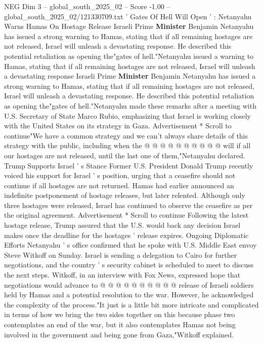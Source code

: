\begin{textsample}{NEG Dim 3 – global\_south\_2025\_02 – Score -1.00 – global\_south\_2025\_02/121330709.txt}  \label{ex:f3_neg_018}
' Gates Of Hell Will Open ' : Netanyahu Warns Hamas On Hostage Release Israeli Prime \textbf{Minister} Benjamin Netanyahu has issued a strong warning to Hamas, stating that if all remaining hostages are not released, Israel will unleash a devastating response.
He described this potential retaliation as opening the"gates of hell."Netanyahu issued a warning to Hamas, stating that if all remaining hostages are not released, Israel will unleash a devastating response Israeli Prime \textbf{Minister} Benjamin Netanyahu has issued a strong warning to Hamas, stating that if all remaining hostages are not released, Israel will unleash a devastating response.
He described this potential retaliation as opening the"gates of hell."Netanyahu made these remarks after a meeting with U.S.
Secretary of State Marco Rubio, emphasizing that Israel is working closely with the United States on its strategy in Gaza.
Advertisement * Scroll to continue"We have a common strategy and we can't always share details of this strategy with the public, including when the @ @ @ @ @ @ @ @ @ @ will if all our hostages are not released, until the last one of them,"Netanyahu declared.
Trump Supports Israel ' s Stance Former U.S.
President Donald Trump recently voiced his support for Israel ' s position, urging that a ceasefire should not continue if all hostages are not returned.
Hamas had earlier announced an indefinite postponement of hostage releases, but later relented.
Although only three hostages were released, Israel has continued to observe the ceasefire as per the original agreement.
Advertisement * Scroll to continue Following the latest hostage release, Trump assured that the U.S. would back any decision Israel makes once the deadline for the hostages ' release expires.
Ongoing Diplomatic Efforts Netanyahu ' s office confirmed that he spoke with U.S.
Middle East envoy Steve Witkoff on Sunday.
Israel is sending a delegation to Cairo for further negotiations, and the country ' s security cabinet is scheduled to meet to discuss the next steps.
Witkoff, in an interview with Fox News, expressed hope that negotiations would advance to @ @ @ @ @ @ @ @ @ @ release of Israeli soldiers held by Hamas and a potential resolution to the war.
However, he acknowledged the complexity of the process."It just is a little bit more intricate and complicated in terms of how we bring the two sides together on this because phase two contemplates an end of the war, but it also contemplates Hamas not being involved in the government and being gone from Gaza,"Witkoff explained.

\end{textsample}
